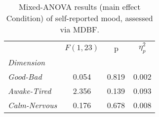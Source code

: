 \begin{table}[h]
\centering
\caption{Mixed-ANOVA results (main effect Condition) of self-reported mood, assessed via MDBF.}
\label{tab:stats_questionnaire_mdbf_pre_post}

\begin{tabular}{l||SSS}
\toprule
{} & {$F(1, 23)$} &         {p} & {$\eta^2_p$} \\
\textit{Dimension}    &              &             &              \\
\midrule
\textit{Good-Bad}     &        0.054 &  0.819$^{}$ &        0.002 \\
\textit{Awake-Tired}  &        2.356 &  0.139$^{}$ &        0.093 \\
\textit{Calm-Nervous} &        0.176 &  0.678$^{}$ &        0.008 \\
\bottomrule
\end{tabular}
\end{table}
